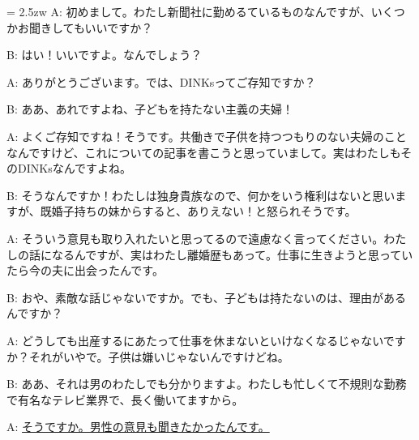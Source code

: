 \documentclass[11pt]{amsart}
\title{}
\author{}
\newenvironment{hangall}[1]{\hangindent = 2.5zw\everypar{\hangindent = 2.5zw}}{}
\begin{document}
\maketitle
\begin{hangall}{}%
A: 初めまして。わたし新聞社に勤めるているものなんですが、いくつかお聞きしてもいいですか？

B: はい！いいですよ。なんでしょう？

A: ありがとうございます。では、DINKsってご存知ですか？

B: ああ、あれですよね、子どもを持たない主義の夫婦！

A: よくご存知ですね！そうです。共働きで子供を持つつもりのない夫婦のことなんですけど、これについての記事を書こうと思っていまして。実はわたしもそのDINKsなんですよね。

B: そうなんですか！わたしは独身貴族なので、何かをいう権利はないと思いますが、既婚子持ちの妹からすると、ありえない！と怒られそうです。

A: そういう意見も取り入れたいと思ってるので遠慮なく言ってください。わたしの話になるんですが、実はわたし離婚歴もあって。仕事に生きようと思っていたら今の夫に出会ったんです。

B: おや、素敵な話じゃないですか。でも、子どもは持たないのは、理由があるんですか？

A: どうしても出産するにあたって仕事を休まないといけなくなるじゃないですか？それがいやで。子供は嫌いじゃないんですけどね。

B: ああ、それは男のわたしでも分かりますよ。わたしも忙しくて不規則な勤務で有名なテレビ業界で、長く働いてますから。

A: \ul{そうですか。男性の意見も聞きたかったんです。}\end{hangall}
\end{document}
